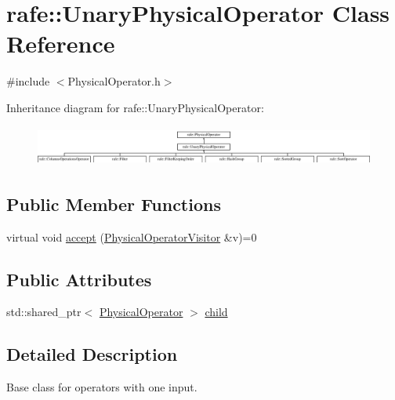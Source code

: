 \hypertarget{classrafe_1_1_unary_physical_operator}{\section{rafe\+:\+:Unary\+Physical\+Operator Class Reference}
\label{classrafe_1_1_unary_physical_operator}
}


{\ttfamily \#include $<$Physical\+Operator.\+h$>$}

Inheritance diagram for rafe\+:\+:Unary\+Physical\+Operator\+:\begin{figure}[H]
\begin{center}
\leavevmode
\includegraphics[height=1.333333cm]{classrafe_1_1_unary_physical_operator}
\end{center}
\end{figure}
\subsection*{Public Member Functions}
\begin{DoxyCompactItemize}
\item 
virtual void \hyperlink{classrafe_1_1_unary_physical_operator_a56a160698a78f8a0aa44e47e0804f45e}{accept} (\hyperlink{classrafe_1_1_physical_operator_visitor}{Physical\+Operator\+Visitor} \&v)=0
\end{DoxyCompactItemize}
\subsection*{Public Attributes}
\begin{DoxyCompactItemize}
\item 
std\+::shared\+\_\+ptr$<$ \hyperlink{classrafe_1_1_physical_operator}{Physical\+Operator} $>$ \hyperlink{classrafe_1_1_unary_physical_operator_a4aecf29ff3b6c81c861cd5e57473fe4c}{child}
\end{DoxyCompactItemize}


\subsection{Detailed Description}
Base class for operators with one input. 

